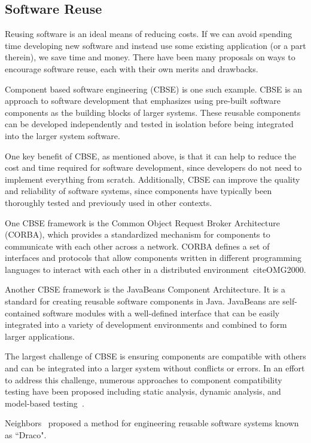 \subsection{Software Reuse}

Reusing software is an ideal means of reducing costs. If we can avoid spending 
time developing new software and instead use some existing application (or a 
part therein), we save time and money. There have been many proposals on ways 
to encourage software reuse, each with their own merits and drawbacks.

Component based software engineering (CBSE) is one such example. CBSE is an 
approach to software development that emphasizes using pre-built software 
components as the building blocks of larger systems. These reusable components 
can be developed independently and tested in isolation before being integrated 
into the larger system software.

One key benefit of CBSE, as mentioned above, is that it can help to reduce the 
cost and time required for software development, since developers do not need 
to implement everything from scratch. Additionally, CBSE can improve the 
quality and reliability of software systems, since components have typically 
been thoroughly tested and previously used in other contexts.

One CBSE framework is the Common Object Request Broker Architecture (CORBA), 
which provides a standardized mechanism for components to 
communicate with each other across a network. CORBA defines a set of interfaces 
and protocols that allow components written in different programming languages 
to interact with each other in a distributed environment~cite{OMG2000}.

Another CBSE framework is the JavaBeans Component Architecture. It is a 
standard for creating reusable software components in Java. JavaBeans are 
self-contained software modules with a well-defined interface that can be 
easily integrated into a variety of development environments and combined to 
form larger applications\cite{Oracle-Javabeans}.

The largest challenge of CBSE is ensuring components are compatible with others 
and can be integrated into a larger system without conflicts or errors. In an 
effort to address this challenge, numerous approaches to component 
compatibility testing have been proposed including static analysis, 
dynamic analysis, and model-based testing~\cite{Wang2013}.

Neighbors~\cite{Neighbors1980,Neighbors1987} proposed a method for engineering 
reusable software systems known as ``Draco".  

